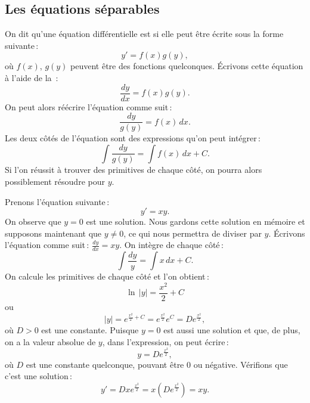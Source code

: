 \subsection{Les équations séparables}

On dit qu'une équation différentielle est
\emph{}
si elle peut être écrite sous la forme suivante\,: 
\begin{equation*}
	y' = f(x)g(y), 
\end{equation*}
où $f(x)$, $g(y)$ peuvent être des fonctions quelconques.
Écrivons cette équation à l'aide de la \,: 
\begin{equation*}
\frac{dy}{dx} = f(x)g(y) .
\end{equation*}
On peut alors réécrire l'équation comme suit\,: 
\begin{equation*}
\frac{dy}{g(y)} = f(x) \,dx .
\end{equation*}
Les deux côtés de l'équation sont des expressions qu'on peut intégrer\,: 
\begin{equation*}
\int \frac{dy}{g(y)} = \int f(x) \,dx + C .
\end{equation*}
Si l'on réussit à trouver des primitives de chaque côté, on pourra alors possiblement résoudre pour $y$.

\begin{example} \label{example:yprimeisxy}
Prenons l'équation  suivante\,: 
\begin{equation*}
y' = xy .
\end{equation*}
On observe que $y=0$ est une solution.  Nous gardons cette solution en mémoire et supposons maintenant que 
$y \not =0$, ce qui nous permettra de diviser par $y$.
Écrivons l'équation comme suit\,: $\frac{dy}{dx} = xy$.  On intègre de chaque côté\,: 
\begin{equation*}
\int \frac{dy}{y} = \int x\,dx + C .
\end{equation*}
On calcule les primitives de chaque côté et l'on obtient\,:
\begin{equation*}
\ln \, \lvert y\rvert = \frac{x^2}{2} + C 
\end{equation*}
ou
\begin{equation*}
\lvert y \rvert = e^{\frac{x^2}{2} + C} = e^{\frac{x^2}{2}} e^C = D e^{\frac{x^2}{2}} ,
\end{equation*}
où $D > 0$ est une constante.  Puisque $y=0$ est aussi une solution et que, de plus, on a la valeur absolue de $y$, dans l'expression, on peut écrire\,: 
%
\begin{equation*}
y = D e^{\frac{x^2}{2}} ,
\end{equation*}
où $D$ est une constante quelconque, pouvant être 0 ou négative.  Vérifions que c'est une solution\,: 
\begin{equation*}
y' = D x e^{\frac{x^2}{2}} = x \left( D e^{\frac{x^2}{2}} \right) = xy .
\end{equation*}
\end{example}

